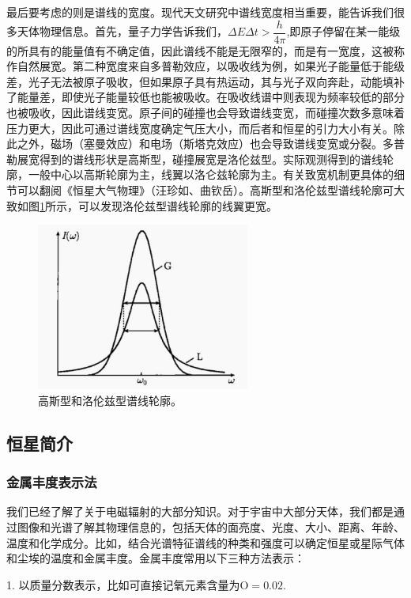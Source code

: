 \documentclass[../天体物理基础.tex]{subfiles}
\begin{document}
最后要考虑的则是谱线的宽度。现代天文研究中谱线宽度相当重要，能告诉我们很多天体物理信息。首先，量子力学告诉我们，$\Delta{}E\Delta{}t>\dfrac{h}{4\pi}$,即原子停留在某一能级的所具有的能量值有不确定值，因此谱线不能是无限窄的，而是有一宽度，这被称作自然展宽。第二种宽度来自多普勒效应，以吸收线为例，如果光子能量低于能级差，光子无法被原子吸收，但如果原子具有热运动，其与光子双向奔赴，动能填补了能量差，即使光子能量较低也能被吸收。在吸收线谱中则表现为频率较低的部分也被吸收，因此谱线变宽。原子间的碰撞也会导致谱线变宽，而碰撞次数多意味着压力更大，因此可通过谱线宽度确定气压大小，而后者和恒星的引力大小有关。除此之外，磁场（塞曼效应）和电场（斯塔克效应）也会导致谱线变宽或分裂。多普勒展宽得到的谱线形状是高斯型，碰撞展宽是洛伦兹型。实际观测得到的谱线轮廓，一般中心以高斯轮廓为主，线翼以洛仑兹轮廓为主。有关致宽机制更具体的细节可以翻阅《恒星大气物理》（汪珍如、曲钦岳）。高斯型和洛伦兹型谱线轮廓可大致如图\ref{高斯型和洛伦兹型谱线轮廓。}所示，可以发现洛伦兹型谱线轮廓的线翼更宽。
\begin{figure}[!htbp]
\centering
\includegraphics[width=7cm]{figures/figure1_16.jpg}
\captionsetup{justification=raggedright, singlelinecheck=false}
\caption{高斯型和洛伦兹型谱线轮廓。}
\label{高斯型和洛伦兹型谱线轮廓。}
\end{figure}

\subsection{恒星简介}
\subsubsection{金属丰度表示法}
我们已经了解了关于电磁辐射的大部分知识。对于宇宙中大部分天体，我们都是通过图像和光谱了解其物理信息的，包括天体的面亮度、光度、大小、距离、年龄、温度和化学成分。比如，结合光谱特征谱线的种类和强度可以确定恒星或星际气体和尘埃的温度和金属丰度。金属丰度常用以下三种方法表示：

1. 以质量分数表示，比如可直接记氧元素含量为$\mathrm{O}=0.02$.
\end{document}
